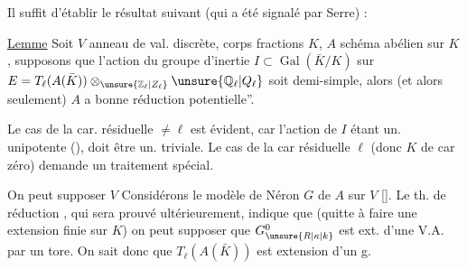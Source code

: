 
Il suffit d'établir le résultat suivant (qui a été signalé par Serre) :

\uline{Lemme} Soit $V$ anneau de val. discrète, corps fractions $K$, $A$ schéma abélien sur $K$,  supposons que l'action du groupe d'inertie  $I\subset\operatorname{Gal}(\bar K/K)$ sur $E=T_\ell(A(\bar K))\otimes_{\unsure{\mathbb Z_\ell|Z_\ell}}\unsure{\mathbb Q_\ell|Q_\ell}$ soit   demi-simple,  alors  (et alors seulement) $A$ a bonne réduction potentielle''.


Le cas de la car. résiduelle $\ne\ell$ est évident, car l'action de $I$ étant un. unipotente (),  doit être un. triviale.  Le cas de la car résiduelle $\ell$ (donc $K$ de car zéro) demande un traitement spécial.

On peut supposer $V$   Considérons le modèle de Néron  $G$ de $A$ sur $V$ [\quad].  Le th. de réduction , qui sera prouvé ultérieurement, indique que (quitte à faire une extension finie sur $K$) on peut supposer que $G_{\unsure{R|\kappa|k}}^0$ est ext. d'une V.A. par un tore.  On sait donc que $T_\ell(A(\bar K))$ est extension d'un g.
